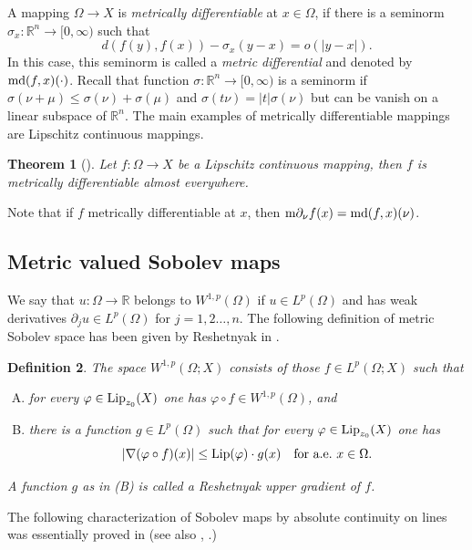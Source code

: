 \documentclass[reqno]{amsart}
\newtheorem{thm}{Theorem}[section]
\newtheorem{defn}[thm]{Definition}
\begin{document}
A mapping $\Omega\to X$ is \emph{ metrically differentiable} at $x\in\Omega$, if there is a seminorm $\sigma_x:\mathbb R^n\to [0,\infty)$
such that
\begin{equation}\label{eq:def-md}
d(f(y), f(x)) - \sigma_x(y-x) = o(|y-x|).
\end{equation}
In this case, this seminorm is called a \emph{ metric differential} and denoted by $\textnormal{md}(f, x)(\cdot)$.
Recall that function $\sigma:\mathbb R^n\to [0,\infty)$ is a seminorm if $\sigma(\nu + \mu) \leq \sigma(\nu) + \sigma(\mu)$
and $\sigma(t\nu) = |t|\sigma(\nu)$ but can be vanish on a linear subspace of $\mathbb R^n$.
The main examples of metrically differentiable mappings are Lipschitz continuous mappings.  
 \begin{thm}[{\cite[Theorem 2]{K1994}}]
 Let $f:\Omega\to X$ be a Lipschitz continuous mapping, then $f$ is metrically differentiable almost everywhere.
 \end{thm}
Note that if $f$ metrically differentiable at $x$, then $\textnormal{m}\partial_{\nu} f(x) = \textnormal{md}(f, x)(\nu)$.
\subsection{Metric valued Sobolev maps}
We say that  $u:\Omega\to \mathbb R$ belongs to $W^{1,p}(\Omega)$
if $u\in L^p(\Omega)$ and has weak derivatives $\partial_j u \in L^{p}(\Omega)$ for $j=1,2\dots, n$.
The following definition of metric Sobolev space has been given by Reshetnyak in \cite{Reshetnyak97}.
\begin{defn}
\label{definition:WX-space}
The space $W^{1,p}(\Omega; X)$ consists of those $f\in L^p(\Omega; X)$ such that
\begin{enumerate}[(A)]
\item for every $\varphi \in \textnormal{Lip}_{z_0}(X)$  one has $\varphi \circ f \in W^{1,p}(\Omega)$, and
\item there is a function $g \in L^p(\Omega)$ such that for every $\varphi \in \textnormal{Lip}_{z_0}(X)$ one has
\[ |\nabla (\varphi\circ f)(x)| \leq \operatorname{Lip}(\varphi)\cdot g(x) \quad \textnormal{for a.e.\ }x\in \Omega.\]
\end{enumerate}
A function $g$ as in (B) is called a Reshetnyak upper gradient of $f$.
\end{defn}


The following characterization of Sobolev maps by absolute continuity on lines was essentially proved in \cite[Lemma 2.13]{HT:08}
(see also \cite[Lemma 3.3]{CE:2021}, \cite[Theorem 3.1]{CJP22}.)
\end{document}
